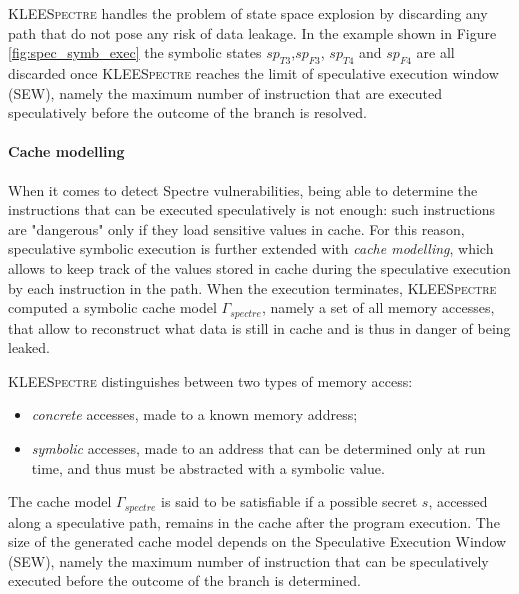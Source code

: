 \documentclass[12pt,a4paper]{book}
\theoremstyle{definition}
\begin{document}
	\textsc{KLEESpectre} handles the problem of state space explosion by discarding any path that do not pose any risk of data leakage. In the example shown in Figure \ref{fig:spec_symb_exec} the symbolic states $sp_{T3}$,$sp_{F3}$, $sp_{T4}$ and $sp_{F4}$ are all discarded once \textsc{KLEESpectre} reaches the limit of speculative execution window (SEW), namely the maximum number of instruction that are executed speculatively before the outcome of the branch is resolved. 
	\paragraph{Cache modelling} 
	When it comes to detect Spectre vulnerabilities, being able to determine the instructions that can be executed speculatively is not enough: such instructions are "dangerous" only if they load sensitive values in cache. For this reason, speculative symbolic execution is further extended with \textit{cache modelling}, which allows to keep track of the values stored in cache during the speculative execution by each instruction in the path. When the execution terminates, \textsc{KLEESpectre} computed a symbolic cache model $\Gamma_{spectre}$, namely a set of all memory accesses, that allow to reconstruct what data is still in cache and is thus in danger of being leaked.
	
	\textsc{KLEESpectre} distinguishes between two types of memory access:
	\begin{itemize}
		\item \textit{concrete} accesses, made to a known memory address;
		\item \textit{symbolic} accesses, made to an address that can be determined only at run time, and thus must be abstracted with a symbolic value. 
	\end{itemize}
	The cache model $\Gamma_{spectre}$ is said to be satisfiable if a possible secret $s$, accessed along a speculative path, remains in the cache after the program execution. The size of the generated cache model depends on the Speculative Execution Window (SEW), namely the maximum number of instruction that can be speculatively executed before the outcome of the branch is determined.
	
\end{document}
